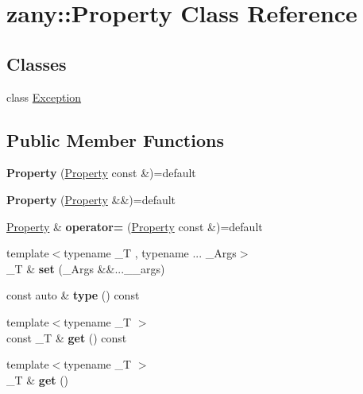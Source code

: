\hypertarget{classzany_1_1_property}{}\section{zany\+:\+:Property Class Reference}
\label{classzany_1_1_property}
\subsection*{Classes}
\begin{DoxyCompactItemize}
\item 
class \hyperlink{classzany_1_1_property_1_1_exception}{Exception}
\end{DoxyCompactItemize}
\subsection*{Public Member Functions}
\begin{DoxyCompactItemize}
\item 
\mbox{\label{classzany_1_1_property_ae7a83f0996273a08f26aa6feaa0bb9be}} 
{\bfseries Property} (\hyperlink{classzany_1_1_property}{Property} const \&)=default
\item 
\mbox{\label{classzany_1_1_property_a983757789ff516b0ddc67737774d5b9d}} 
{\bfseries Property} (\hyperlink{classzany_1_1_property}{Property} \&\&)=default
\item 
\mbox{\label{classzany_1_1_property_abd3ea6b99db33b7abbcfbe485d142fb0}} 
\hyperlink{classzany_1_1_property}{Property} \& {\bfseries operator=} (\hyperlink{classzany_1_1_property}{Property} const \&)=default
\item 
\mbox{\label{classzany_1_1_property_a18f9780866a85faf641e5651c71db9ac}} 
{\footnotesize template$<$typename \+\_\+T , typename ... \+\_\+\+Args$>$ }\\\+\_\+T \& {\bfseries set} (\+\_\+\+Args \&\&...\+\_\+\+\_\+args)
\item 
\mbox{\label{classzany_1_1_property_a7e2e8f6ed76d5a31906c7a7c6df2c2c9}} 
const auto \& {\bfseries type} () const
\item 
\mbox{\label{classzany_1_1_property_aad7fa5243b635b0995b4a217008a2075}} 
{\footnotesize template$<$typename \+\_\+T $>$ }\\const \+\_\+T \& {\bfseries get} () const
\item 
\mbox{\label{classzany_1_1_property_a5a2dc4853d9edaff7427896817b680c2}} 
{\footnotesize template$<$typename \+\_\+T $>$ }\\\+\_\+T \& {\bfseries get} ()
\end{DoxyCompactItemize}
